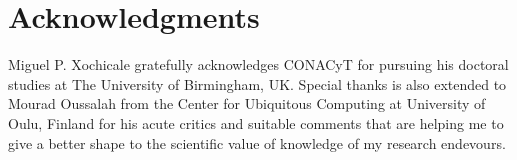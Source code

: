 \documentclass{sigchi}
\begin{document}
%
%
%
%




%
%
%


\section{Acknowledgments}
Miguel P. Xochicale gratefully acknowledges
CONACyT
for pursuing his doctoral studies at The University of Birmingham, UK.
Special thanks is also extended to Mourad Oussalah from the Center for
Ubiquitous Computing at University of Oulu, Finland for his acute critics
and suitable comments that are helping me to give a better shape
to the scientific value of knowledge of my research endevours.
\end{document}
